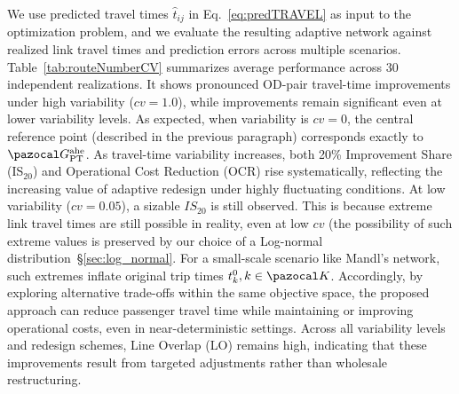 \documentclass[a4paper,fleqn]{cas-sc}
\begin{document}
We use predicted travel times $\hat{t}_{ij}$ in Eq.~\eqref{eq:predTRAVEL} as input to the optimization problem, and we evaluate the resulting adaptive network against realized link travel times and prediction errors across multiple scenarios.
%
Table~\ref{tab:routeNumberCV} summarizes average performance across 30 independent realizations.
It shows pronounced OD-pair travel-time improvements under high variability ($cv=1.0$), while improvements remain significant even at lower variability levels.
As expected, when variability is $\textit{cv}=0$, the central reference point (described in the previous paragraph) corresponds exactly to~$\pazocal G_\text{PT}^\text{ahe}$. 
As travel-time variability increases, both 20\% Improvement Share (IS$_{20}$) and Operational Cost Reduction (OCR) rise systematically, reflecting the increasing value of adaptive redesign under highly fluctuating conditions.
At low variability ($cv=0.05$), a sizable $IS_{20}$ is still observed. This is because extreme link travel times are still possible in reality, even at low $cv$ (the possibility of such extreme values is preserved by our choice of a Log-normal distribution~\S{}\ref{sec:log_normal}. For a small-scale scenario like Mandl’s network, such extremes inflate original trip times $t_k^0, k\in\pazocal K$.
Accordingly, by exploring alternative trade-offs within the same objective space, the proposed approach can reduce passenger travel time while maintaining or improving operational costs, even in near-deterministic settings.
%
Across all variability levels and redesign schemes, Line Overlap (LO) remains high, indicating that these improvements result from targeted adjustments rather than wholesale restructuring. 

\end{document}
